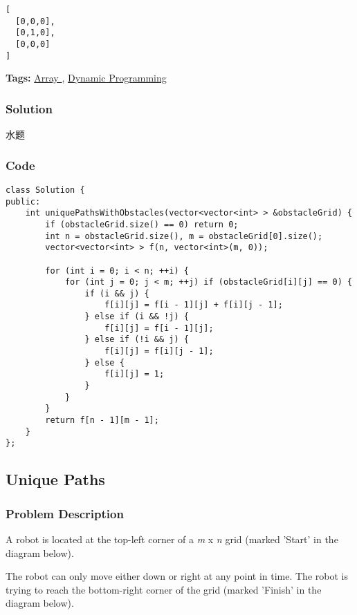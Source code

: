 \documentclass{article}
\begin{document}
\begin{CJK*}{UTF8}{gkai}
\begin{verbatim}
[
  [0,0,0],
  [0,1,0],
  [0,0,0]
]
\end{verbatim}

\textbf{Tags: }
\hyperref[ Array ]{ Array },  \hyperref[ Dynamic Programming ]{ Dynamic Programming }



\subsubsection*{Solution}
水题

\subsubsection*{Code}
\begin{lstlisting}
class Solution {
public:
    int uniquePathsWithObstacles(vector<vector<int> > &obstacleGrid) {
        if (obstacleGrid.size() == 0) return 0;
        int n = obstacleGrid.size(), m = obstacleGrid[0].size();
        vector<vector<int> > f(n, vector<int>(m, 0));
        
        for (int i = 0; i < n; ++i) {
            for (int j = 0; j < m; ++j) if (obstacleGrid[i][j] == 0) {
                if (i && j) {
                    f[i][j] = f[i - 1][j] + f[i][j - 1];
                } else if (i && !j) {
                    f[i][j] = f[i - 1][j];
                } else if (!i && j) {
                    f[i][j] = f[i][j - 1];
                } else {
                    f[i][j] = 1;
                }
            }
        }
        return f[n - 1][m - 1];
    }
}; 
\end{lstlisting}


\subsection{ Unique Paths }
\label{ Unique Paths }

\subsubsection*{Problem Description}
A robot is located at the top-left corner of a \emph{m} x \emph{n} grid (marked 'Start' in the diagram below).

The robot can only move either down or right at any point in time. The robot is trying to reach the bottom-right corner of the grid (marked 'Finish' in the diagram below).


\end{CJK*}
\end{document}
